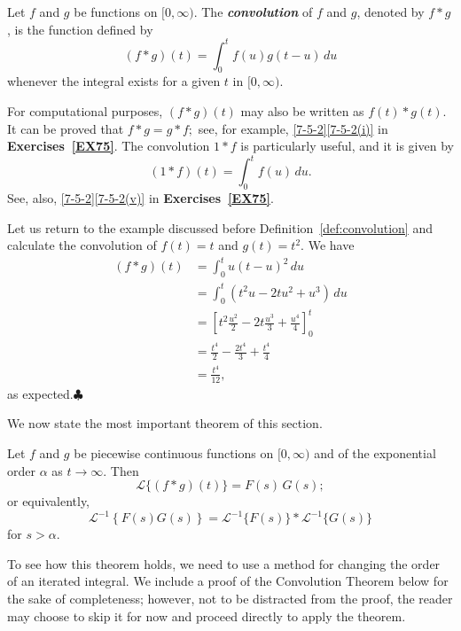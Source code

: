 \begin{definition}\label{def:convolution}
	Let $f$ and $g$ be functions on $[0, \infty).$ The \textbf{\textit{convolution}} of $f$ and $g$, denoted by $f\ast g$, is the function defined by
	\[(f\ast g)(t) = \int_0^t f(u) g(t-u)\, du\] whenever the integral exists for a given $t$ in $[0, \infty).$
\end{definition}
For computational purposes, $(f * g)(t)$ may also be written as $f(t) * g(t)$.
It can be proved that $f\ast g = g\ast f;$ see, for example, \ref{7-5-2}\;\ref{7-5-2(i)} in  \textbf{Exercises~\ref{EX75}}. The convolution $1\ast f$ is particularly useful, and it  is given by
\begin{equation}\label{special-convolution}
	(1\ast f)(t) = \int_0^t f(u) \, du.
	\end{equation}
	See, also,  \ref{7-5-2}\;\ref{7-5-2(v)} in \textbf{Exercises~\ref{EX75}}.
\begin{example}
Let us return to the example discussed before Definition~\ref{def:convolution}  and calculate the convolution of $f(t) =t$ and $g(t) =t^2$. We have
	\[
	\begin{split}
		(f\ast g)(t)& = \int_0^t u (t-u)^2\, du\\
		&= \int_0^t (t^2u-2tu^2 +u^3)\, du\\
		&= \left[t^2\frac{u^2}{2}-2t\frac{u^3}{3}+\frac{u^4}{4}\right]_0^t\\
		&=\frac{t^4}{2}-\frac{2t^4}{3}+\frac{t^4}{4}\\
		&=\frac{t^4}{12},
	\end{split}
	\]
as expected.\hfill$\clubsuit$
\end{example}
We now state the most important theorem of this section. 
\begin{theorem}\label{thm:convolution-theorem}
	Let $f$ and $g$ be piecewise continuous functions on $[0,\infty)$ and of the exponential order $\alpha$ as $t\to\infty$.
	Then
	\[ \mathscr{L}\{(f\ast g)(t)\}= F(s) \,G(s);\]
	or equivalently,
	\[\mathscr{L}^{-1}\left\{ F(s) G(s)\right\} =\mathscr{L}^{-1}\{F(s)\}\ast \mathscr{L}^{-1}\{G(s)\}\] for $s>\alpha.$
\end{theorem}

To see how this theorem holds, we need to use a method for changing the order of an iterated integral. 
We include a proof of the Convolution Theorem below for the sake of completeness; however, not to be distracted from the proof, the reader may choose to skip it for now and proceed directly to apply the theorem.

